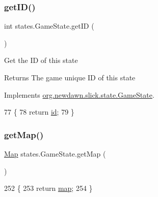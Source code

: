 \subsubsection{\texorpdfstring{get\+I\+D()}{getID()}}
{\footnotesize\ttfamily int states.\+Game\+State.\+get\+ID (\begin{DoxyParamCaption}{ }\end{DoxyParamCaption})\hspace{0.3cm}{\ttfamily [inline]}}

Get the ID of this state

\begin{DoxyReturn}{Returns}
The game unique ID of this state 
\end{DoxyReturn}


Implements \mbox{\hyperlink{interfaceorg_1_1newdawn_1_1slick_1_1state_1_1_game_state_a54f2bc6a91feaf0614a5ef19f1d03313}{org.\+newdawn.\+slick.\+state.\+Game\+State}}.


\begin{DoxyCode}
77                        \{
78         \textcolor{keywordflow}{return} \mbox{\hyperlink{classstates_1_1_game_state_a6753ed5810e190d122a36ede7a52d4b3}{id}};
79     \}
\end{DoxyCode}
\mbox{\label{classstates_1_1_game_state_a5ef1de01f68adafec12bb3bb78010e2e}} 
\subsubsection{\texorpdfstring{get\+Map()}{getMap()}}
{\footnotesize\ttfamily \mbox{\hyperlink{classentities_1_1_map}{Map}} states.\+Game\+State.\+get\+Map (\begin{DoxyParamCaption}{ }\end{DoxyParamCaption})\hspace{0.3cm}{\ttfamily [inline]}}


\begin{DoxyCode}
252                         \{
253         \textcolor{keywordflow}{return} \mbox{\hyperlink{classstates_1_1_game_state_ab5dc1b5f4f87c6fc5684832bfba3b939}{map}};
254     \}
\end{DoxyCode}
\mbox{\label{classstates_1_1_game_state_a624f1d82e4bfb86a85f7e624b9010209}} 

